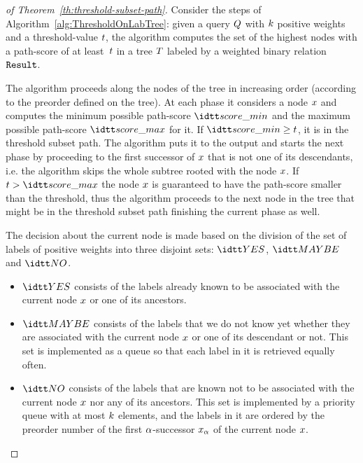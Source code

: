 \begin{PROOF}
  \begin{proof}[of Theorem~\ref{th:threshold-subset-path}]
    Consider the steps of Algorithm~\ref{alg:ThresholdOnLabTree}:
    given a query $Q$ with $k$ positive weights and a
    threshold-value $t$, the algorithm computes the set of
    the highest nodes with a path-score of at least~$t$ in a
    tree $T$ labeled by a weighted binary relation $\hbox{\tt Result}$.


  The algorithm proceeds along the nodes of the tree in increasing
  order (according to the preorder defined on the tree). At each phase
  it considers a node $x$ and computes the minimum possible
  path-score $\scoremin$ and the maximum possible path-score
  $\scoremax$ for it. If $\scoremin \ge \threshold$, it is in the
  threshold subset path. The algorithm puts it to the output and
  starts the next phase by proceeding to the first successor of
  $x$ that is not one of its descendants, i.e. the algorithm
  skips the whole subtree rooted with the node $x$.
%
  If $\threshold > \scoremax$ the node $x$ is guaranteed to have
  the path-score smaller than the threshold, thus the algorithm
  proceeds to the next node in the tree that might be in the threshold
  subset path finishing the current phase as well.

  The decision about the current node is made based on the division of
  the set of labels of positive weights into three disjoint sets:
  $\setYES$, $\setMAYBE$ and $\setNO$.
  \begin{itemize}
  \item $\setYES$ consists of the labels already known to be
    associated with the current node $x$ or one of its ancestors.
  \item $\setMAYBE$ consists of the labels that we do not know yet
    whether they are associated with the current node $x$ or one
    of its descendant or not.
    This set is implemented as a queue so that each label in it is
    retrieved equally often.
  \item $\setNO$ consists of the labels that are known not to be
    associated with the current node $x$ nor any of its
    ancestors.
    This set is implemented by a priority queue with at most
    $k$ elements, and the labels in it are ordered by the
    preorder number of the first $\alpha$-successor $x_\alpha$
    of the current node $x$.
  \end{itemize}


\end{proof}
\end{PROOF}
